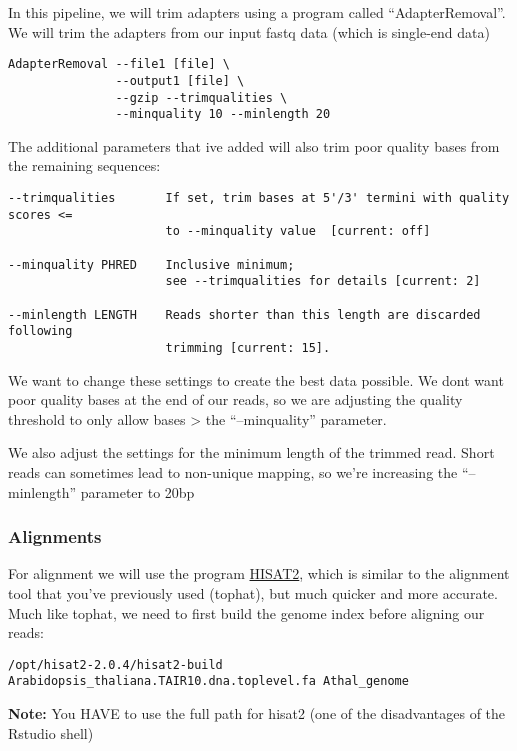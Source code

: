 In this pipeline, we will trim adapters using a program called
``AdapterRemoval''. We will trim the adapters from our input fastq data
(which is single-end data)

\begin{verbatim}
AdapterRemoval --file1 [file] \
               --output1 [file] \
               --gzip --trimqualities \
               --minquality 10 --minlength 20
\end{verbatim}

The additional parameters that ive added will also trim poor quality
bases from the remaining sequences:

\begin{verbatim}
--trimqualities       If set, trim bases at 5'/3' termini with quality scores <=
                      to --minquality value  [current: off]

--minquality PHRED    Inclusive minimum;
                      see --trimqualities for details [current: 2]

--minlength LENGTH    Reads shorter than this length are discarded following
                      trimming [current: 15].
\end{verbatim}

We want to change these settings to create the best data possible. We
dont want poor quality bases at the end of our reads, so we are
adjusting the quality threshold to only allow bases \textgreater{} the
``--minquality'' parameter.

We also adjust the settings for the minimum length of the trimmed read.
Short reads can sometimes lead to non-unique mapping, so we're
increasing the ``--minlength'' parameter to 20bp

\subsubsection{Alignments}\label{alignments}

For alignment we will use the program
\href{https://ccb.jhu.edu/software/hisat2/index.shtml}{HISAT2}, which is
similar to the alignment tool that you've previously used (tophat), but
much quicker and more accurate. Much like tophat, we need to first build
the genome index before aligning our reads:

\begin{verbatim}
/opt/hisat2-2.0.4/hisat2-build Arabidopsis_thaliana.TAIR10.dna.toplevel.fa Athal_genome
\end{verbatim}

\textbf{Note:} You HAVE to use the full path for hisat2 (one of the
disadvantages of the Rstudio shell)

